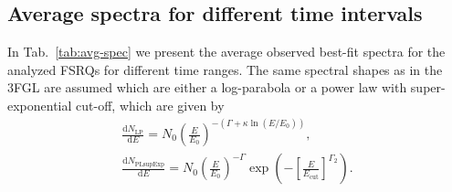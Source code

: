 \documentclass[twocolumn,linenumbers]{aastex62}
\begin{document}
\begin{appendix}

\section{Average spectra for different time intervals}
\label{sec:avg-spec}
In Tab.~\ref{tab:avg-spec} we present the average observed best-fit spectra for the analyzed FSRQs for different time ranges. 
The same spectral shapes as in the 3FGL are assumed which are either a log-parabola or a power law with super-exponential cut-off, which are given by
\begin{eqnarray}
    \frac{\mathrm{d}N_\mathrm{LP}}{\mathrm{d}E} = N_0 \left(\frac{E}{E_0}\right)^{-(\Gamma + \kappa\ln(E / E_0))}, \label{eq:avg-spec-lp}\\
    \frac{\mathrm{d}N_\mathrm{PLsupExp}}{\mathrm{d}E} = N_0 \left(\frac{E}{E_0}\right)^{-\Gamma}\exp\left(-\left[\frac{E}{E_\mathrm{cut}} \right]^{\Gamma_2}\right)\label{eq:avg-spec-plexp}.
\end{eqnarray}


\end{appendix}
\end{document}
